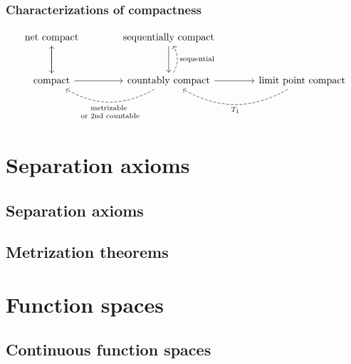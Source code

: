 \documentclass{../crs}
\begin{document}
\subsection{Characterizations of compactness}
\[
\begin{tikzcd}[column sep=large,row sep=large]
\text{net compact} \arrow{d} & \text{sequentially compact} \arrow{d} & \\
\text{compact} \arrow{u}\arrow{r} & \text{countably compact} \arrow{r}\arrow[dashed,bend left]{l}{\scriptsize\begin{tabular}{c}\text{metrizable }\\or\text{ 2nd countable}\end{tabular}} \arrow[dashed,bend right,swap]{u}{\text{sequential}} & \text{limit point compact} \arrow[dashed,bend left]{l}{T_1}
\end{tikzcd}
\]






























\chapter{Separation axioms}

\section{Separation axioms}
\section{Metrization theorems}





\chapter{Function spaces}






\section{Continuous function spaces}
\end{document}
